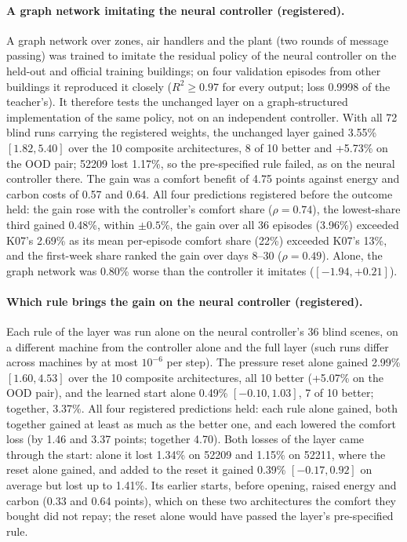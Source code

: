 \paragraph{A graph network imitating the neural controller (registered).} A graph network over zones, air handlers and the plant (two rounds of message
passing) was trained to imitate the residual policy of the neural controller on the held-out and official training
buildings; on four validation episodes from other buildings it reproduced it closely ($R^2 \ge 0.97$ for every output; loss
0.9998 of the teacher's). It therefore tests the unchanged layer on a graph-structured implementation of the same policy,
not on an independent controller. With all 72 blind runs carrying the registered weights,
the unchanged layer gained 3.55\% $[1.82, 5.40]$ over the 10 composite architectures, 8 of 10 better and +5.73\% on the OOD
pair; 52209 lost 1.17\%, so the pre-specified rule failed, as on the neural controller there. The gain was a comfort benefit of
4.75 points against energy and carbon costs of 0.57 and 0.64. All four predictions registered before the outcome held: the gain
rose with the controller's comfort share ($\rho = 0.74$), the lowest-share third gained 0.48\%, within $\pm 0.5\%$, the gain
over all 36 episodes (3.96\%) exceeded K07's 2.69\% as its mean per-episode comfort share (22\%) exceeded K07's 13\%, and the first-week
share ranked the gain over days 8--30 ($\rho = 0.49$). Alone, the graph network was 0.80\% worse than the controller it
imitates ($[-1.94, +0.21]$).

\paragraph{Which rule brings the gain on the neural controller (registered).} Each rule of the layer was run alone on the neural controller's 36 blind scenes, on a different machine
from the controller alone and the full layer (such runs differ across machines by at most $10^{-6}$ per step). The pressure
reset alone gained 2.99\% $[1.60, 4.53]$ over the 10 composite architectures, all 10 better (+5.07\% on the OOD pair), and the
learned start alone 0.49\% $[-0.10, 1.03]$, 7 of 10 better; together, 3.37\%. All four registered predictions held: each rule
alone gained, both together gained at least as much as the better one, and each lowered the comfort loss (by 1.46 and 3.37
points; together 4.70). Both losses of the layer came through the start: alone it lost 1.34\% on 52209 and
1.15\% on 52211, where the reset alone gained, and added to the reset it gained 0.39\% $[-0.17, 0.92]$ on average but lost up to
1.41\%. Its earlier starts, before opening, raised energy and carbon (0.33 and 0.64 points), which on these two architectures
the comfort they bought did not repay; the reset alone would have passed the layer's pre-specified rule.

